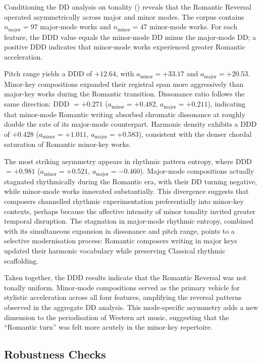 \documentclass[]{interact}
\theoremstyle{plain}
\theoremstyle{definition}
\theoremstyle{remark}
\begin{document}
Conditioning the DD analysis on tonality () reveals that the
Romantic Reversal operated asymmetrically across major and minor modes.
The corpus contains $n_{\text{major}} = 97$ major-mode works and
$n_{\text{minor}} = 47$ minor-mode works. For each feature, the DDD value
equals the minor-mode DD minus the major-mode DD; a positive DDD indicates
that minor-mode works experienced greater Romantic acceleration.

Pitch range yields a DDD of $+12.64$, with $a_{\text{minor}} = +33.17$ and
$a_{\text{major}} = +20.53$. Minor-key compositions expanded their registral
span more aggressively than major-key works during the Romantic transition.
Dissonance ratio follows the same direction: DDD $= +0.271$
($a_{\text{minor}} = +0.482$, $a_{\text{major}} = +0.211$), indicating that
minor-mode Romantic writing absorbed chromatic dissonance at roughly double the
rate of its major-mode counterpart. Harmonic density exhibits a DDD of
$+0.428$ ($a_{\text{minor}} = +1.011$, $a_{\text{major}} = +0.583$),
consistent with the denser chordal saturation of Romantic minor-key works.

The most striking asymmetry appears in rhythmic pattern entropy, where DDD $=
+0.981$ ($a_{\text{minor}} = +0.521$, $a_{\text{major}} = -0.460$).
Major-mode compositions actually stagnated rhythmically during the Romantic
era, with their DD turning negative, while minor-mode works innovated
substantially. This divergence suggests that composers channelled rhythmic
experimentation preferentially into minor-key contexts, perhaps because the
affective intensity of minor tonality invited greater temporal disruption.
The stagnation in major-mode rhythmic entropy, combined with its simultaneous
expansion in dissonance and pitch range, points to a selective modernisation
process: Romantic composers writing in major keys updated their harmonic
vocabulary while preserving Classical rhythmic scaffolding.

Taken together, the DDD results indicate that the Romantic Reversal was not
tonally uniform. Minor-mode compositions served as the primary vehicle for
stylistic acceleration across all four features, amplifying the reversal
patterns observed in the aggregate DD analysis. This mode-specific asymmetry
adds a new dimension to the periodisation of Western art music, suggesting that
the ``Romantic turn'' was felt more acutely in the minor-key repertoire.

\subsection{Robustness Checks}\label{sec:robustness}
\end{document}
